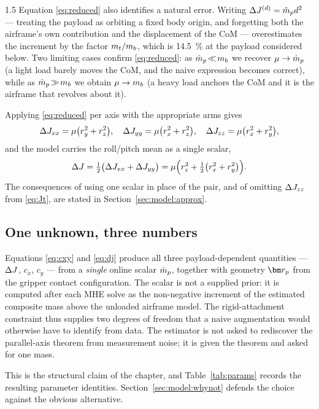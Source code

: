 \begin{spacing}{1.5}
Equation \eqref{eq:reduced} also identifies a natural error. Writing
$\Delta J^{(d)} = \hat{m}_p d^2$ --- treating the payload as orbiting a fixed
body origin, and forgetting both the airframe's own contribution and the
displacement of the CoM --- overestimates the increment by the factor
$m_t / m_b$, which is \SI{14.5}{\percent} at the payload considered
below. Two limiting cases confirm \eqref{eq:reduced}: as
$\hat{m}_p \!\ll\! m_b$ we recover $\mu \to \hat{m}_p$ (a light load barely moves
the CoM, and the naive expression becomes correct), while as
$\hat{m}_p \!\gg\! m_b$ we obtain $\mu \to m_b$ (a heavy load anchors the CoM
and it is the airframe that revolves about it).

Applying \eqref{eq:reduced} per axis with the appropriate arms gives
\begin{equation}
\Delta J_{xx} = \mu\bigl(r_y^2 + r_z^2\bigr), \quad
\Delta J_{yy} = \mu\bigl(r_x^2 + r_z^2\bigr), \quad
\Delta J_{zz} = \mu\bigl(r_x^2 + r_y^2\bigr),
\label{eq:djaxes}
\end{equation}
and the model carries the roll/pitch mean as a single scalar,
\begin{equation}
\Delta J = \tfrac{1}{2}\bigl(\Delta J_{xx} + \Delta J_{yy}\bigr)
    = \mu\Bigl( r_z^2 + \tfrac{1}{2}\bigl(r_x^2 + r_y^2\bigr) \Bigr).
\label{eq:dj}
\end{equation}
The consequences of using one scalar in place of the pair, and of
omitting $\Delta J_{zz}$ from \eqref{eq:Jt}, are stated in
Section~\ref{sec:model:approx}.

\subsection{One unknown, three numbers}\label{sec:model:onescalar}

Equations \eqref{eq:cxy} and \eqref{eq:dj} produce all three
payload-dependent quantities --- $\Delta J$, $c_x$, $c_y$ --- from a
\emph{single} online scalar $\hat{m}_p$, together with geometry $\rp$ from
the gripper contact configuration. The scalar is not a supplied prior:
it is computed after each MHE solve as the non-negative increment of the
estimated composite mass above the unloaded airframe model. The
rigid-attachment constraint thus supplies two degrees of freedom that a
naive augmentation would otherwise have to identify from data. The
estimator is not asked to rediscover the parallel-axis theorem from
measurement noise; it is given the theorem and asked for one mass.

This is the structural claim of the chapter, and
Table~\ref{tab:params} records the resulting parameter identities.
Section~\ref{sec:model:whynot} defends the choice against the obvious
alternative.


\end{spacing}
